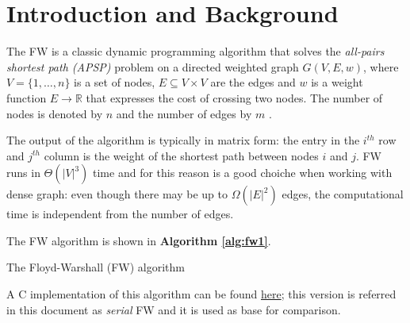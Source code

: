 \section{Introduction and Background}
The FW is a classic dynamic programming algorithm that solves the \emph{all-pairs shortest path (APSP)} problem on a directed weighted
graph $G(V, E, w)$, where $V = \{1, \dots, n\}$ is a set of nodes, $E \subseteq V \times V$ are the edges and $w$ is a weight function $E \rightarrow  \mathbb{R}$
that expresses the cost of crossing two nodes. The number of nodes is denoted by $n$ and the number of edges by $m$ . \par
The output of the algorithm is typically in matrix form: the entry in the $i^{th}$ row and $j^{th}$ column is the weight of the shortest path between
nodes $i$ and $j$. FW runs in $\Theta(|V|^3)$ time and for this reason is a good choiche when working with dense graph: even though there
may be up to $\Omega(|E|^2)$ edges, the computational time is independent from the number of edges. \par
The FW algorithm is shown in \textbf{Algorithm \ref*{alg:fw1}}.

\begin{algorithm}[h!]

\SetAlgoLined

 
\caption{The Floyd-Warshall (FW) algorithm}\label{alg:fw1}
\end{algorithm}



A C implementation of this algorithm can be found \href{https://github.com/firaja/Parallel-FloydWarshall/blob/master/sequential.c}{here};
this version is referred in this document as \emph{serial} FW and it is used as base for comparison. \par 

